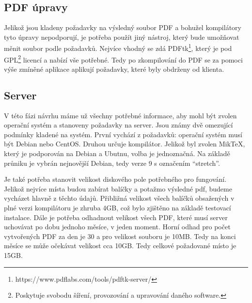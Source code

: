\subsection{PDF úpravy}
Jelikož jsou kladeny požadavky na výsledný soubor PDF a bohužel kompilátory tyto úpravy nepodporují, je potřeba použít jiný nástroj, který bude umožňovat měnit soubor podle požadavků. Nejvíce vhodný se zdá PDFtk\footnote{https://www.pdflabs.com/tools/pdftk-server/}, který je pod GPL\footnote{Poskytuje svobodu šíření, provozování a upravování daného software.} licencí a nabízí vše potřebné. Tedy po zkompilování do PDF se za pomoci výše zmíněné aplikace aplikují požadavky, které byly obdrženy od klienta.

\subsection{Server}
V této fázi návrhu máme už všechny potřebné informace, aby mohl být zvolen operační systém a stanoveny požadavky na server. Jsou známy dvě omezující podmínky kladené na systém. První vychází z požadavků: operační systém musí být Debian nebo CentOS. Druhou určuje kompilátor. Jelikož byl zvolen MikTeX, který je podporován na Debian a Ubutnu, volba je jednoznačná. Na základě průniku je vybrán nejnovější Debian, tedy verze 9 s označením \enquote{stretch}. 
\par
Je také potřeba stanovit velikost diskového pole potřebného pro fungování. Jelikož nejvíce místa budou zabírat balíčky a potažmo výsledné pdf, budeme vycházet hlavně z těchto údajů. Přibližná velikost všech balíčků obsažených v plné verzi kompilátoru je zhruba 4GB, což bylo zjištěno na základě testovací instalace. Dále je potřeba odhadnout velikost všech PDF, které musí server uchovávat po dobu jednoho měsíce, v jeden moment. Horní odhad pro počet vytvořených PDF za den je 30 a pro velikost souboru je 10MB. Tedy na konci měsíce se může očekávat velikost cca 10GB. Tedy celkové požadované místo je 15GB.  
 



